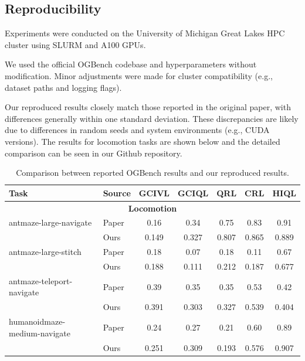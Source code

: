 \documentclass[11pt]{article}
\begin{document}
\subsection*{Reproducibility}

Experiments were conducted on the University of Michigan Great Lakes HPC cluster
using SLURM and A100 GPUs.

We used the official OGBench codebase and hyperparameters without modification.
Minor adjustments were made for cluster compatibility (e.g., dataset paths and
logging flags).

Our reproduced results closely match those reported in the original paper, with
differences generally within one standard deviation. These discrepancies are
likely due to differences in random seeds and system environments (e.g., CUDA
versions). The results for locomotion tasks are shown below and the detailed comparison can be seen in our Github repository.

\begin{table}[h]
\centering
\small
\begin{tabular}{l|l|ccccc}
\hline
Task & Source & GCIVL & GCIQL & QRL & CRL & HIQL \\
\hline

\multicolumn{7}{c}{\textbf{Locomotion}} \\
\hline
antmaze-large-navigate 
& Paper & 0.16 & 0.34 & 0.75 & 0.83 & 0.91 \\
& Ours  & 0.149 & 0.327 & 0.807 & 0.865 & 0.889 \\

antmaze-large-stitch 
& Paper & 0.18 & 0.07 & 0.18 & 0.11 & 0.67 \\
& Ours  & 0.188 & 0.111 & 0.212 & 0.187 & 0.677 \\

antmaze-teleport-navigate 
& Paper & 0.39 & 0.35 & 0.35 & 0.53 & 0.42 \\
& Ours  & 0.391 & 0.303 & 0.327 & 0.539 & 0.404 \\

humanoidmaze-medium-navigate 
& Paper & 0.24 & 0.27 & 0.21 & 0.60 & 0.89 \\
& Ours  & 0.251 & 0.309 & 0.193 & 0.576 & 0.907 \\

\hline
\end{tabular}
\caption{Comparison between reported OGBench results and our reproduced results.}
\label{tab:reproduce}
\end{table}
\end{document}
